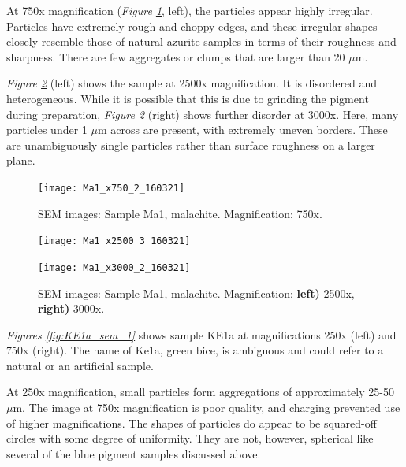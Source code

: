 At 750x magnification (\textit{Figure \ref{fig:Ma1_sem_1}}, left), the particles appear highly irregular. Particles have extremely rough and choppy edges, and these irregular shapes closely resemble those of natural azurite samples in terms of their roughness and sharpness. There are few aggregates or clumps that are larger than 20 $\mu$m.  

\textit{Figure \ref{fig:Ma1_sem_2}} (left) shows the sample at 2500x magnification. It is disordered and heterogeneous. While it is possible that this is due to grinding the pigment during preparation, \textit{Figure \ref{fig:Ma1_sem_2}} (right) shows further disorder at 3000x. Here, many particles under 1 $\mu$m across are present, with extremely uneven borders. These are unambiguously single particles rather than surface roughness on a larger plane.

\begin{figure}[H]
\centering
\texttt{[image: Ma1\_x750\_2\_160321]}
\caption[SEM images: Sample Ma1, malachite]{SEM images: Sample Ma1, malachite. Magnification: 750x.}
\label{fig:Ma1_sem_1}
\end{figure}

\begin{figure}[H]
\centering
\begin{minipage}{.45\textwidth}
  \centering
  \texttt{[image: Ma1\_x2500\_3\_160321]}
\end{minipage}
\begin{minipage}{.45\textwidth}
  \centering
  \texttt{[image: Ma1\_x3000\_2\_160321]}
\end{minipage}
\caption[SEM images: Sample Ma1, malachite]{SEM images: Sample Ma1, malachite. Magnification: \textbf{left)} 2500x, \textbf{right)} 3000x.}
\label{fig:Ma1_sem_2}
\end{figure}


\textit{Figures \ref{fig:KE1a_sem_1}} shows sample KE1a at magnifications 250x (left) and 750x (right). The name of Ke1a, green bice, is ambiguous and could refer to a natural or an artificial sample.

At 250x magnification, small particles form aggregations of approximately 25-50 $\mu$m. The image at 750x magnification is poor quality, and charging prevented use of higher magnifications. The shapes of particles do appear to be squared-off circles with some degree of uniformity. They are not, however, spherical like several of the blue pigment samples discussed above. 

